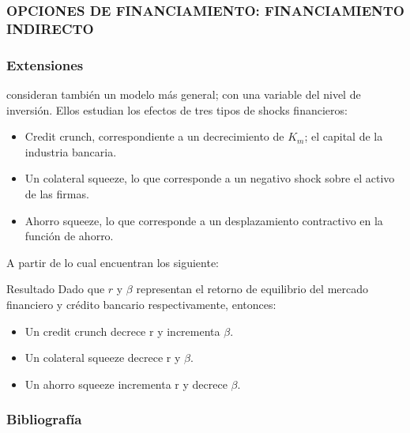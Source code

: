 \documentclass[10pt, xcolor=table, x11names]{beamer}
\begin{document}
\begin{frame}
    \frametitle{{\normalsize OPCIONES DE FINANCIAMIENTO: FINANCIAMIENTO INDIRECTO} {}}
\end{frame}

\begin{frame}
    \frametitle{{\normalsize Extensiones} {}}
  \cite{Tirole1997} consideran también un modelo más general; con una variable del nivel de inversión. Ellos estudian los efectos de tres tipos de shocks financieros:
    \begin{itemize}
        \item Credit crunch, correspondiente a un decrecimiento de $K_{m}$; el capital de la industria bancaria.
        \item Un colateral squeeze, lo que corresponde a un negativo shock sobre el activo de las firmas.
        \item Ahorro squeeze, lo que corresponde a un desplazamiento contractivo en la función de ahorro.
    \end{itemize}
      A partir de lo cual encuentran los siguiente:
      \begin{block} {Resultado}
        Dado que $r$ y $\beta$ representan el retorno de equilibrio del mercado financiero y crédito bancario respectivamente, entonces:
        \begin{itemize}
            \item Un credit crunch decrece r y incrementa $\beta$.
            \item Un colateral squeeze decrece r y  $\beta$.
            \item Un ahorro squeeze incrementa r y decrece $\beta$.
        \end{itemize}  
      \end{block}
\end{frame}


\begin{frame}[allowframebreaks]
    \frametitle{{\large 
            Bibliografía}}
    \renewcommand{\refname}{Referencias}
    
    
\end{frame}
\end{document}
